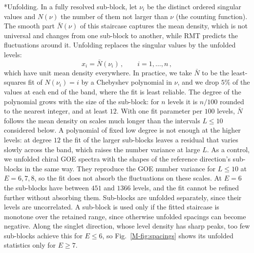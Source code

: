 \documentclass[aps,onecolumn,groupedaddress,nofootinbib,pra]{revtex4-2}
\makeatletter
\renewcommand\paragraph{\@startsection{paragraph}{4}{\parindent}{\z@}{-1em}{\normalfont\normalsize\bfseries}}
\makeatother
\begin{document}
\paragraph*{Unfolding.}
In a fully resolved sub-block, let $\nu_i$ be the distinct ordered singular values and $N(\nu)$ the number of them not larger than $\nu$ (the counting function). The smooth part $\bar N(\nu)$ of this staircase captures the mean density, which is not universal and changes from one sub-block to another, while RMT predicts the fluctuations around it. Unfolding replaces the singular values by the unfolded levels:
\begin{equation}
\label{eq:unfold}
x_i=\bar N(\nu_i)\,,\qquad i=1,\dots,n\,,
\end{equation}
which have unit mean density everywhere. In practice, we take $\bar N$ to be the least-squares fit of $N(\nu_i)=i$ by a Chebyshev polynomial in $\nu$, and we drop $5\%$ of the values at each end of the band, where the fit is least reliable. The degree of the polynomial grows with the size of the sub-block: for $n$ levels it is $n/100$ rounded to the nearest integer, and at least $12$. With one fit parameter per $100$ levels, $\bar N$ follows the mean density on scales much longer than the intervals $L\le10$ considered below. A polynomial of fixed low degree is not enough at the higher levels: at degree $12$ the fit of the larger sub-blocks leaves a residual that varies slowly across the band, which raises the number variance at large $L$. As a control, we unfolded chiral GOE spectra with the shapes of the reference direction's sub-blocks in the same way. They reproduce the GOE number variance for $L\le10$ at $E=6,7,8$, so the fit does not absorb the fluctuations on these scales. At $E=6$ the sub-blocks have between $451$ and $1366$ levels, and the fit cannot be refined further without absorbing them. Sub-blocks are unfolded separately, since their levels are uncorrelated. A sub-block is used only if the fitted staircase is monotone over the retained range, since otherwise unfolded spacings can become negative. Along the singlet direction, whose level density has sharp peaks, too few sub-blocks achieve this for $E\leq 6$, so Fig.~\ref{M-fig:spacings} shows its unfolded statistics only for $E\geq7$.\\
\end{document}
